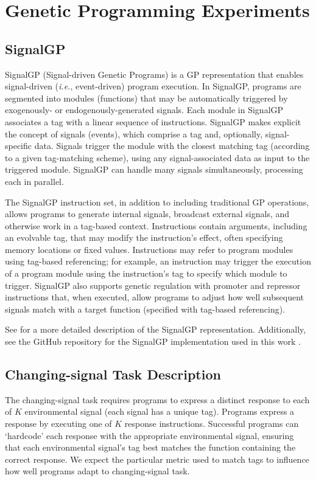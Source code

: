 \section{Genetic Programming Experiments}

\subsection{SignalGP}

SignalGP (Signal-driven Genetic Programs) is a GP representation that enables signal-driven (\textit{i.e.}, event-driven) program execution.
In SignalGP, programs are segmented into modules (functions) that may be automatically triggered by exogenously- or endogenously-generated signals.
Each module in SignalGP associates a tag with a linear sequence of instructions.
SignalGP makes explicit the concept of signals (events), which comprise a tag and, optionally, signal-specific data.
Signals trigger the module with the closest matching tag (according to a given tag-matching scheme), using any signal-associated data as input to the triggered module.
SignalGP can handle many signals simultaneously, processing each in parallel.

The SignalGP instruction set, in addition to including traditional GP operations, allows programs to generate internal signals, broadcast external signals, and otherwise work in a tag-based context.
Instructions contain arguments, including an evolvable tag, that may modify the instruction's effect, often specifying memory locations or fixed values.
Instructions may refer to program modules using tag-based referencing; for example, an instruction may trigger the execution of a program module using the instruction's tag to specify which module to trigger.
SignalGP also supports genetic regulation with promoter and repressor instructions that, when executed, allow programs to adjust how well subsequent signals match with a target function (specified with tag-based referencing).

See  for a more detailed description of the SignalGP representation. Additionally, see the GitHub repository for the SignalGP implementation used in this work .

\subsection{Changing-signal Task Description}

The changing-signal task requires programs to express a distinct response to each of $K$ environmental signal (each signal has a unique tag).
Programs express a response by executing one of $K$ response instructions.
Successful programs can `hardcode' each response with the appropriate environmental signal, ensuring that each environmental signal's tag best matches the function containing the correct response.
We expect the particular metric used to match tags to influence how well programs adapt to changing-signal task.


